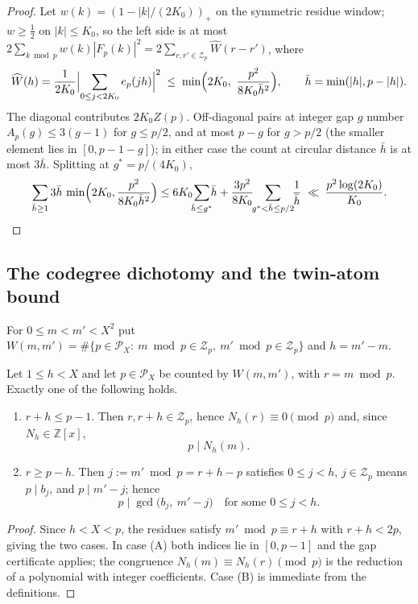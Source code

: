 \begin{proof}
Let $w(k)=(1-|k|/(2K_0))_+$ on the symmetric residue window;
$w\ge\frac12$ on $|k|\le K_0$, so the left side is at most
$2\sum_{k\bmod p}w(k)|F_p(k)|^2
=2\sum_{r,r'\in\mathcal Z_p}\widehat W(r-r')$, where
\[
 \widehat W(h)=\frac1{2K_0}\Bigl|\sum_{0\le j<2K_0}e_p(jh)\Bigr|^2
 \;\le\;\min\Bigl(2K_0,\ \frac{p^2}{8K_0\bar h^2}\Bigr),
 \qquad \bar h=\min(|h|,p-|h|).
\]
The diagonal contributes $2K_0Z(p)$.  Off-diagonal pairs at
integer gap $g$ number $A_p(g)\le3(g-1)$ for $g\le p/2$, and at
most $p-g$ for $g>p/2$ (the smaller element lies in
$[0,p-1-g]$); in either case the count at circular distance
$\bar h$ is at most $3\bar h$.  Splitting at
$g^*=p/(4K_0)$,
\[
 \sum_{\bar h\ge1}3\bar h\,
 \min\Bigl(2K_0,\frac{p^2}{8K_0\bar h^2}\Bigr)
 \le 6K_0\!\!\sum_{\bar h\le g^*}\!\!\bar h
 +\frac{3p^2}{8K_0}\!\!\sum_{g^*<\bar h\le p/2}\!\!\frac1{\bar h}
 \;\ll\;\frac{p^2\log(2K_0)}{K_0}. \qedhere
\]
\end{proof}

\subsection{The codegree dichotomy and the twin-atom bound}

For $0\le m<m'<X^2$ put
$W(m,m')=\#\{p\in\mathcal P_X:\ m\bmod p\in\mathcal Z_p,\
m'\bmod p\in\mathcal Z_p\}$ and $h=m'-m$.

\begin{lemma}\label{lem:atomtail-dichotomy}
Let $1\le h<X$ and let $p\in\mathcal P_X$ be counted by
$W(m,m')$, with $r=m\bmod p$.  Exactly one of the following
holds.
\begin{enumerate}
\item[\textup{(A)}] $r+h\le p-1$.  Then $r,r+h\in\mathcal Z_p$,
hence $N_h(r)\equiv0\pmod p$ and, since $N_h\in\mathbb Z[x]$,
\[
  p\mid N_h(m).
\]
\item[\textup{(B)}] $r\ge p-h$.  Then $j:=m'\bmod p=r+h-p$
satisfies $0\le j<h$, $j\in\mathcal Z_p$ means $p\mid b_j$, and
$p\mid m'-j$; hence
\[
  p\mid\gcd\bigl(b_j,\ m'-j\bigr)
  \quad\text{for some }0\le j<h.
\]
\end{enumerate}
\end{lemma}

\begin{proof}
Since $h<X<p$, the residues satisfy $m'\bmod p\equiv r+h$ with
$r+h<2p$, giving the two cases.  In case (A) both indices lie in
$[0,p-1]$ and the gap certificate applies; the congruence
$N_h(m)\equiv N_h(r)\pmod p$ is the reduction of a polynomial
with integer coefficients.  Case (B) is immediate from the
definitions.
\end{proof}

